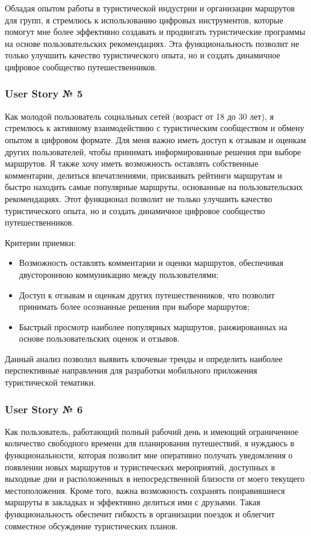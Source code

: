 Обладая опытом работы в туристической индустрии и организации маршрутов для групп, я стремлюсь к использованию цифровых инструментов, которые помогут мне более эффективно создавать и продвигать туристические программы на основе пользовательских рекомендациях. Эта функциональность позволит не только улучшить качество туристического опыта, но и создать динамичное цифровое сообщество путешественников.

\subsubsection*{User Story № 5} 
Как молодой пользователь социальных сетей (возраст от 18 до 30 лет), я стремлюсь к активному взаимодействию с туристическим сообществом и обмену опытом в цифровом формате. Для меня важно иметь доступ к отзывам и оценкам других пользователей, чтобы принимать информированные решения при выборе маршрутов. Я также хочу иметь возможность оставлять собственные комментарии, делиться впечатлениями, присваивать рейтинги маршрутам и быстро находить самые популярные маршруты, основанные на пользовательских рекомендациях. Этот функционал позволит не только улучшить качество туристического опыта, но и создать динамичное цифровое сообщество путешественников.

Критерии приемки:
\begin{itemize}
    \item Возможность оставлять комментарии и оценки маршрутов, обеспечивая двустороннюю коммуникацию между пользователями;
    \item Доступ к отзывам и оценкам других путешественников, что позволит принимать более осознанные решения при выборе маршрутов;
    \item Быстрый просмотр наиболее популярных маршрутов, ранжированных на основе пользовательских оценок и отзывов.
\end{itemize}

Данный анализ позволил выявить ключевые тренды и определить наиболее перспективные направления для разработки мобильного приложения туристической тематики.

\subsubsection*{User Story № 6} 
Как пользователь, работающий полный рабочий день и имеющий ограниченное количество свободного времени для планирования путешествий, я нуждаюсь в функциональности, которая позволит мне оперативно получать уведомления о появлении новых маршрутов и туристических мероприятий, доступных в выходные дни и расположенных в непосредственной близости от моего текущего местоположения. Кроме того, важна возможность сохранять понравившиеся маршруты в закладках и эффективно делиться ими с друзьями. Такая функциональность обеспечит гибкость в организации поездок и облегчит совместное обсуждение туристических планов.

